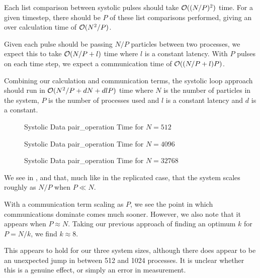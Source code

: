 Each list comparison between systolic pulses should take $\mathcal{O}{((N/P)^2)}$ time.
%
For a given timestep, there should be $P$ of these list comparisons
performed, giving an over calculation time of $\mathcal{O}{(N^2/P)}$.

Given each pulse should be passing $N/P$ particles between two processes,
we expect this to take $\mathcal{O}{(N/P + l)}$ time where $l$ is a constant latency.
%
With $P$ pulses on each time step, we expect a communication time of
$\mathcal{O}{((N/P + l)P)}$.

Combining our calculation and communication terms, the systolic loop approach
should run in $\mathcal{O}{(N^2/P + dN + dlP)}$ time
where $N$ is the number of particles in the system,
$P$ is the number of processes used and
$l$ is a constant latency and
$d$ is a constant.

\begin{figure}
    
    \caption{Systolic Data pair\_operation Time for $N = 512$}
    \label{fig:v0_systolic_pair_operation_512_logtime}
\end  {figure}

\begin{figure}
    
    \caption{Systolic Data pair\_operation Time for $N = 4096$}
    \label{fig:v0_systolic_pair_operation_4096_logtime}
\end  {figure}

\begin{figure}
    
    \caption{Systolic Data pair\_operation Time for $N = 32768$}
    \label{fig:v0_systolic_pair_operation_32768_logtime}
\end  {figure}

We see in 
,
 and
that, much like in the replicated case, that the system scales
roughly as $N/P$ when $P \ll{} N$.

With a communication term scaling as $P$, we see the point in which
communications dominate comes much sooner.
%
However, we also note that it appears when $P \approx{} N$.
%
Taking our previous approach of finding an optimum $k$ for $P = N/k$,
we find $k \approx{} 8$.

This appears to hold for our three system sizes, although there does appear
to be an unexpected jump in
between 512 and 1024 processes.
%
It is unclear whether this is a genuine effect, or simply an error in
measurement.

